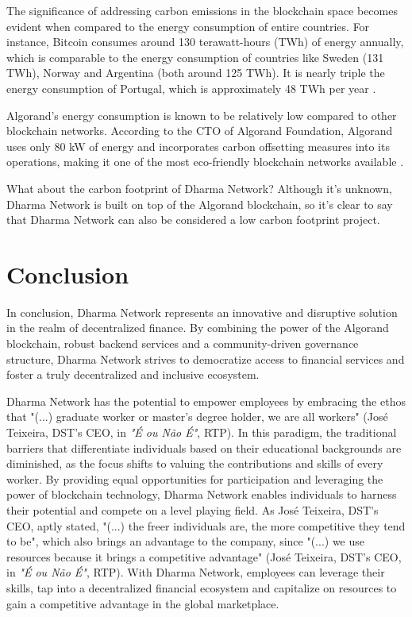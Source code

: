 The significance of addressing carbon emissions in the blockchain space becomes evident when compared to the energy consumption of entire countries. For instance, Bitcoin consumes around 130 terawatt-hours (TWh) of energy annually, which is comparable to the energy consumption of countries like Sweden (131 TWh), Norway and Argentina (both around 125 TWh). It is nearly triple the energy consumption of Portugal, which is approximately 48 TWh per year \cite{ns}.\newline

Algorand's energy consumption is known to be relatively low compared to other blockchain networks. According to the CTO of Algorand Foundation, Algorand uses only 80 kW of energy and incorporates carbon offsetting measures into its operations, making it one of the most eco-friendly blockchain networks available \cite{daddy, tel}.\newline

What about the carbon footprint of Dharma Network? Although it's unknown, Dharma Network is built on top of the Algorand blockchain, so it's clear to say that Dharma Network can also be considered a low carbon footprint project. 


\section{Conclusion}

In conclusion, Dharma Network represents an innovative and disruptive solution in the realm of decentralized finance. By combining the power of the Algorand blockchain, robust backend services and a community-driven governance structure, Dharma Network strives to democratize access to financial services and foster a truly decentralized and inclusive ecosystem.\newline

Dharma Network has the potential to empower employees by embracing the ethos that "(...) graduate worker or master's degree holder, we are all workers" (José Teixeira, DST's CEO, in \textit{"É ou Não É"}, RTP). In this paradigm, the traditional barriers that differentiate individuals based on their educational backgrounds are diminished, as the focus shifts to valuing the contributions and skills of every worker. By providing equal opportunities for participation and leveraging the power of blockchain technology, Dharma Network enables individuals to harness their potential and compete on a level playing field. As José Teixeira, DST's CEO, aptly stated, "(...) the freer individuals are, the more competitive they tend to be", which also brings an advantage to the company, since "(...) we use resources because it brings a competitive advantage" (José Teixeira, DST's CEO, in \textit{"É ou Não É"}, RTP). With Dharma Network, employees can leverage their skills, tap into a decentralized financial ecosystem and capitalize on resources to gain a competitive advantage in the global marketplace. \newline

